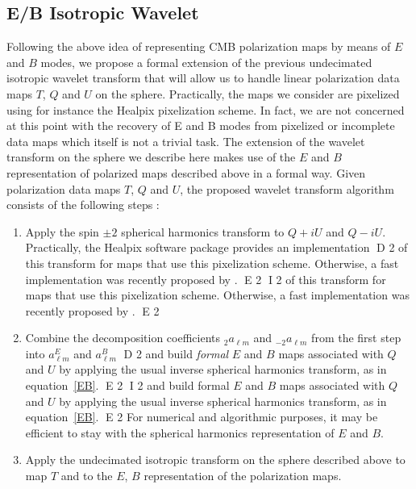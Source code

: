 \subsection{E/B Isotropic Wavelet}
Following the above idea of representing CMB polarization maps by means of $E$ and $B$ modes, we propose a formal extension of the previous 
undecimated isotropic wavelet transform that will allow us to handle linear polarization data maps $T$, $Q$ and $U$ on the sphere. Practically, 
the maps we consider are pixelized using for instance the Healpix pixelization scheme. In fact, we are not concerned at this point with the 
recovery of E and B modes from pixelized or incomplete data maps which itself is not a trivial task. The extension of the wavelet transform 
on the sphere we describe here makes use of the $E$ and $B$ representation of polarized maps described above in a formal way. Given polarization 
data maps $T$, $Q$ and $U$, the proposed wavelet transform algorithm consists of the following steps : 
\vspace{.1cm}
\begin{center}
\begin{minipage}[b]{0.85\linewidth}
\footnotesize{
\begin{enumerate}
\item Apply the spin $\pm 2$ spherical harmonics transform to $Q+iU$ and $Q-iU$. Practically, the Healpix software package provides an implementation 
D 2
of this transform for maps that use this pixelization scheme. Otherwise, a fast implementation was recently proposed by \cite{wiauxspin2}.
E 2
I 2
of this transform for maps that use this pixelization scheme. Otherwise, a fast implementation was recently proposed by \citep{wiauxspin2}.
E 2
\item Combine the decomposition coefficients ${ _{2}a_{\ell m}}$ and ${ _{-2}a_{\ell m}}$ from the first step into $a_{\ell m}^E$ and $a_{\ell m}^B$ 
D 2
and build \emph{formal} $E$ and $B$ maps associated with $Q$ and $U$ by applying the usual inverse spherical harmonics transform, as in equation~\ref{EB}. 
E 2
I 2
and build formal $E$ and $B$ maps associated with $Q$ and $U$ by applying the usual inverse spherical harmonics transform, as in equation~\eqref{EB}. 
E 2
For numerical and algorithmic purposes, it may be efficient to stay with the spherical harmonics representation of $E$ and $B$.
\item Apply the undecimated isotropic transform on the sphere described above to map $T$ and to the $E$, $B$ representation of the polarization maps. 
\end{enumerate}}
\end{minipage}
\end{center}
